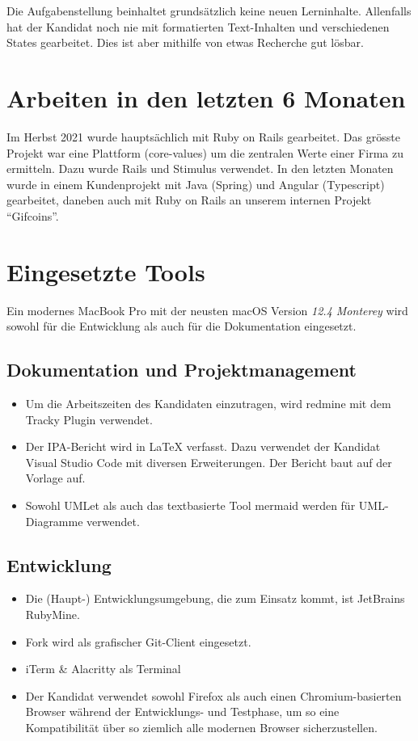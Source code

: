 Die Aufgabenstellung beinhaltet grundsätzlich keine neuen Lerninhalte. Allenfalls hat der Kandidat noch nie mit formatierten Text-Inhalten und verschiedenen States gearbeitet. Dies ist aber mithilfe von etwas Recherche gut lösbar.

\section{Arbeiten in den letzten 6 Monaten}

Im Herbst 2021 wurde hauptsächlich mit Ruby on Rails gearbeitet. Das grösste Projekt war eine Plattform (core-values) um die zentralen Werte einer Firma zu ermitteln.
Dazu wurde Rails und Stimulus verwendet. In den letzten Monaten wurde in einem Kundenprojekt mit Java (Spring) und Angular (Typescript) gearbeitet, daneben auch mit Ruby on Rails an unserem internen Projekt “Gifcoins”.

\section{Eingesetzte Tools} \label{sec:tools}

Ein modernes MacBook Pro mit der neusten macOS Version \emph{12.4 Monterey} wird sowohl für die Entwicklung als auch für die Dokumentation eingesetzt.

\subsection{Dokumentation und Projektmanagement}

\begin{itemize}
    \item Um die Arbeitszeiten des Kandidaten einzutragen, wird redmine mit dem Tracky Plugin verwendet.
    \item Der IPA-Bericht wird in LaTeX verfasst. Dazu verwendet der Kandidat Visual Studio Code mit diversen Erweiterungen.
          Der Bericht baut auf der Vorlage \cite{Buhler_ipa-template_2022} auf.
    \item Sowohl UMLet als auch das textbasierte Tool mermaid werden für UML-Diagramme verwendet.
\end{itemize}

\subsection{Entwicklung}

\begin{itemize}
    \item Die (Haupt-) Entwicklungsumgebung, die zum Einsatz kommt, ist JetBrains RubyMine.
    \item Fork wird als grafischer Git-Client eingesetzt.
    \item iTerm \& Alacritty als Terminal
    \item Der Kandidat verwendet sowohl Firefox als auch einen Chromium-basierten Browser während der Entwicklungs- und Testphase, 
    um so eine Kompatibilität über so ziemlich alle modernen Browser sicherzustellen.
\end{itemize}

